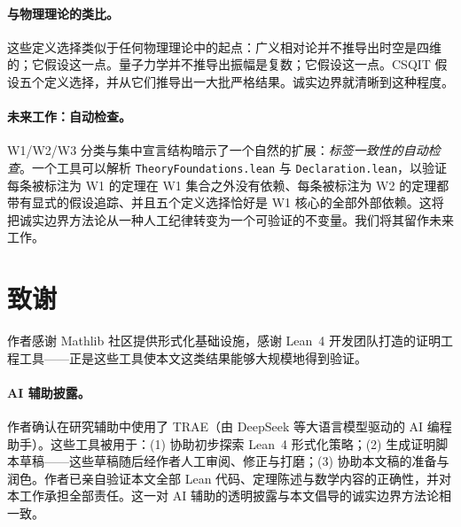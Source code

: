 \documentclass[11pt]{ctexart}
\begin{document}
\paragraph{与物理理论的类比。}
这些定义选择类似于任何物理理论中的起点：广义相对论并不推导出时空是四维的；它假设这一点。量子力学并不推导出振幅是复数；它假设这一点。CSQIT 假设五个定义选择，并从它们推导出一大批严格结果。诚实边界就清晰到这种程度。

\paragraph{未来工作：自动检查。}
W1/W2/W3 分类与集中宣言结构暗示了一个自然的扩展：\emph{标签一致性的自动检查}。一个工具可以解析 \texttt{TheoryFoundations.lean} 与 \texttt{Declaration.lean}，以验证每条被标注为 W1 的定理在 W1 集合之外没有依赖、每条被标注为 W2 的定理都带有显式的假设追踪、并且五个定义选择恰好是 W1 核心的全部外部依赖。这将把诚实边界方法论从一种人工纪律转变为一个可验证的不变量。我们将其留作未来工作。

\section*{致谢}
作者感谢 Mathlib 社区提供形式化基础设施，感谢 Lean~4 开发团队打造的证明工程工具——正是这些工具使本文这类结果能够大规模地得到验证。

\paragraph{AI 辅助披露。}
作者确认在研究辅助中使用了 TRAE（由 DeepSeek 等大语言模型驱动的 AI 编程助手）。这些工具被用于：(1) 协助初步探索 Lean~4 形式化策略；(2) 生成证明脚本草稿——这些草稿随后经作者人工审阅、修正与打磨；(3) 协助本文稿的准备与润色。作者已亲自验证本文全部 Lean 代码、定理陈述与数学内容的正确性，并对本工作承担全部责任。这一对 AI 辅助的透明披露与本文倡导的诚实边界方法论相一致。
\end{document}
